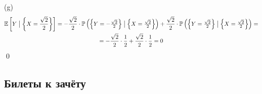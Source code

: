 \documentclass[12pt, a4paper]{article}\usepackage[]{graphicx}\usepackage[]{color}
\begin{document}
\begin{enumerate}
					(g)
					\begin{multline}
					\mathbb{E}\left[Y\bigm|\left\{X = \frac{\sqrt{2}}{2}\right\}\right] = -\frac{\sqrt{2}}{2} \cdot \mathbb{P}\left(\left\{Y=-\tfrac{\sqrt{2}}{2}\right\} \bigm| \left\{X = \tfrac{\sqrt{2}}{2}\right\}\right) + \frac{\sqrt{2}}{2} \cdot \mathbb{P}\left(\left\{Y=\tfrac{\sqrt{2}}{2}\right\} \bigm| \left\{X = \tfrac{\sqrt{2}}{2}\right\}\right) = \\
					= -\frac{\sqrt{2}}{2} \cdot \frac{1}{2} + \frac{\sqrt{2}}{2} \cdot \frac{1}{2} = 0
					\end{multline}
					\qed


				\end{enumerate}

				\subsection{Билеты к зачёту}
\end{document}

